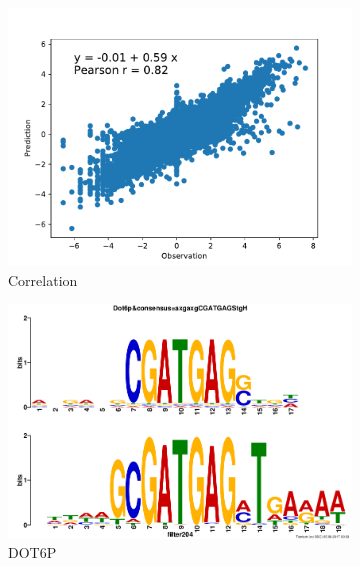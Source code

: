 \documentclass{article}
\begin{document}
\begin{figure}[h]
    \centering
    \begin{subfigure}{.475\textwidth}
        \includegraphics[width=\textwidth]{fig/correlation_tensor_product.pdf}
        \caption[Correlation]{Correlation}
    \end{subfigure}\hfill
    \parbox{.475\textwidth}{
        \begin{subfigure}{.475\linewidth}
            \includegraphics[width=\textwidth]{fig/tomtom/dot6p_2.png}
            \caption{DOT6P}
    \end{subfigure}
    \begin{subfigure}{.475\linewidth}

\end{subfigure}}
\end{figure}
\end{document}
